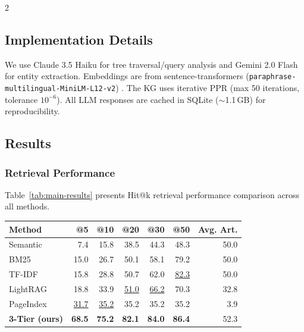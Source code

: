 \documentclass[11pt,a4paper]{article}
\begin{document}
\begin{multicols}{2}
\subsection{Implementation Details}

We use Claude 3.5 Haiku for tree traversal/query analysis and Gemini 2.0 Flash for entity extraction. Embeddings are from sentence-transformers (\texttt{paraphrase-multilingual-\allowbreak{}MiniLM-L12-v2}) \cite{ref_sbert}. The KG uses iterative PPR (max 50 iterations, tolerance $10^{-6}$). All LLM responses are cached in SQLite ($\sim$1.1\,GB) for reproducibility.

\subsection{Results}

\subsubsection{Retrieval Performance}

Table~\ref{tab:main-results} presents Hit@k retrieval performance comparison across all methods.

\vspace{0.3em}
\noindent
\centering\small
{}
\label{tab:main-results}
\begin{tabular}{l@{\hskip 3pt}r@{\hskip 3pt}r@{\hskip 3pt}r@{\hskip 3pt}r@{\hskip 3pt}r@{\hskip 3pt}r}
\toprule
\textbf{Method} & \textbf{@5} & \textbf{@10} & \textbf{@20} & \textbf{@30} & \textbf{@50} & \textbf{Avg. Art.} \\
\midrule
Semantic & 7.4 & 15.8 & 38.5 & 44.3 & 48.3 & 50.0 \\
BM25 & 15.0 & 26.7 & 50.1 & 58.1 & 79.2 & 50.0 \\
TF-IDF & 15.8 & 28.8 & 50.7 & 62.0 & \underline{82.3} & 50.0 \\
LightRAG & 18.8 & 33.9 & \underline{51.0} & \underline{66.2} & 70.3 & 32.8 \\
PageIndex & \underline{31.7} & \underline{35.2} & 35.2 & 35.2 & 35.2 & 3.9 \\
\textbf{3-Tier (ours)} & \textbf{68.5} & \textbf{75.2} & \textbf{82.1} & \textbf{84.0} & \textbf{86.4} & 52.3 \\
\bottomrule
\end{tabular}
\normalsize
\justifying
\vspace{0.3em}
\justifying


\end{multicols}
\end{document}
